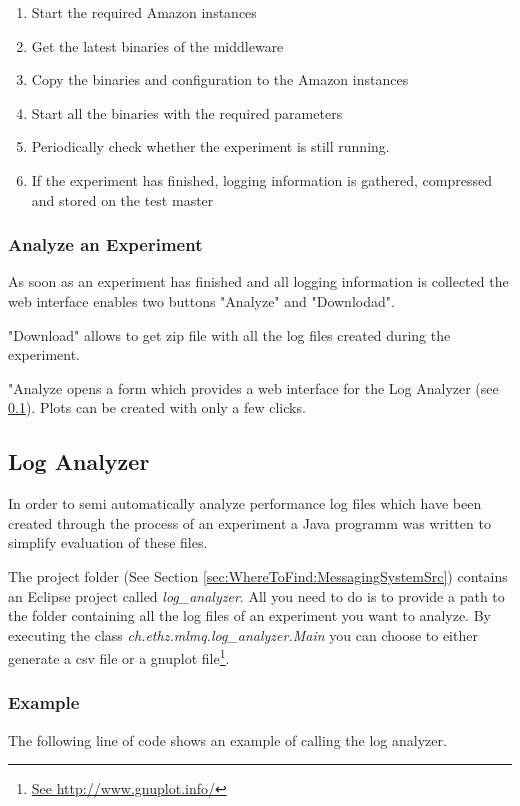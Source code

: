 \documentclass[a4paper]{article}
\begin{document}
\begin{enumerate}
\item Start the required Amazon instances
\item Get the latest binaries of the middleware
\item Copy the binaries and configuration to the Amazon instances
\item Start all the binaries with the required parameters
\item Periodically check whether the experiment is still running.
\item If the experiment has finished, logging information is gathered, compressed and stored on the test master
\end{enumerate}

\subsubsection{Analyze an Experiment}
As soon as an experiment has finished and all logging information is collected the web interface enables two buttons "Analyze" and "Downlodad". 

"Download" allows to get zip file with all the log files created during the experiment.

"Analyze opens a form which provides a web interface for the Log Analyzer (see \ref{subsec:LogAnalyzer}). Plots can be created with only a few clicks.

\subsection{Log Analyzer}
\label{subsec:LogAnalyzer}

In order to semi automatically analyze performance log files which have been created through the process of an experiment a Java programm was written to simplify evaluation of these files.

The project folder (See Section \ref{sec:WhereToFind:MessagingSystemSrc}) contains an Eclipse project called \textit{log\_analyzer}. All you need to do is to provide a path to the folder containing all the log files of an experiment you want to analyze. By executing the class \textit{ch.ethz.mlmq.log\_analyzer.Main} you can choose to either generate a csv file or a gnuplot file\footnote{\url{See http://www.gnuplot.info/}}.


\subsubsection{Example}
The following line of code shows an example of calling the log analyzer.
\end{document}
